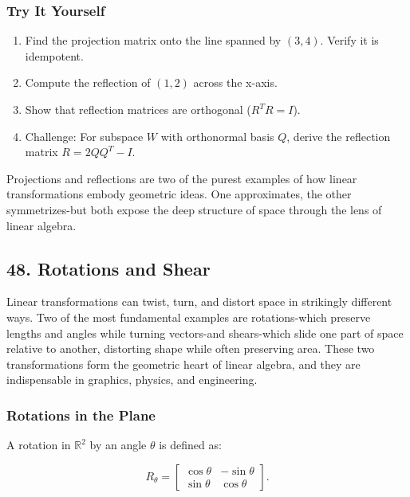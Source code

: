 \documentclass[
  letterpaper,
  DIV=11,
  numbers=noendperiod]{scrreprt}
\providecommand{\tightlist}{%
  \setlength{\itemsep}{0pt}\setlength{\parskip}{0pt}}
\begin{document}
\subsubsection{Try It Yourself}\label{try-it-yourself-46}

\begin{enumerate}
\def\labelenumi{\arabic{enumi}.}
\tightlist
\item
  Find the projection matrix onto the line spanned by \((3,4)\). Verify
  it is idempotent.
\item
  Compute the reflection of \((1,2)\) across the x-axis.
\item
  Show that reflection matrices are orthogonal (\(R^T R = I\)).
\item
  Challenge: For subspace \(W\) with orthonormal basis \(Q\), derive the
  reflection matrix \(R = 2QQ^T - I\).
\end{enumerate}

Projections and reflections are two of the purest examples of how linear
transformations embody geometric ideas. One approximates, the other
symmetrizes-but both expose the deep structure of space through the lens
of linear algebra.

\subsection{48. Rotations and Shear}\label{rotations-and-shear}

Linear transformations can twist, turn, and distort space in strikingly
different ways. Two of the most fundamental examples are rotations-which
preserve lengths and angles while turning vectors-and shears-which slide
one part of space relative to another, distorting shape while often
preserving area. These two transformations form the geometric heart of
linear algebra, and they are indispensable in graphics, physics, and
engineering.

\subsubsection{Rotations in the Plane}\label{rotations-in-the-plane}

A rotation in \(\mathbb{R}^2\) by an angle \(\theta\) is defined as:

\[
R_\theta = \begin{bmatrix} \cos\theta & -\sin\theta \\ \sin\theta & \cos\theta \end{bmatrix}.
\]
\end{document}
